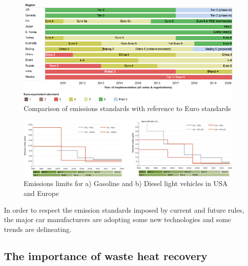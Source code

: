 \begin{figure}[ht]
  \centering
  \includegraphics[width=\textwidth]{figures/review/emission_standards.png}
  \caption{Comparison of emissions standards with reference to Euro standards\label{fig:emission_standards} }
\end{figure}

\begin{figure}[ht]
  \centering
  \includegraphics[width=\textwidth]{figures/review/emissions_levels.png}
  \caption{Emissions limits for a) Gasoline and b) Diesel light vehicles in USA and Europe\label{fig:emission_levels} }
\end{figure}

In order to respect the emission standards imposed by current and future rules, the major car manufacturers are adopting some new technologies and some trends are delineating.



\subsection{The importance of waste heat recovery}




